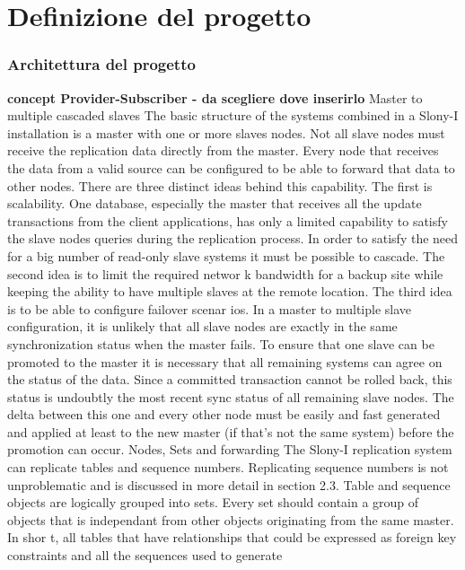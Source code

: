 \chapter{Definizione del progetto}
\setcounter{section}{1}
\item
\subsection{Architettura del progetto}
\textbf{concept Provider-Subscriber - da scegliere dove inserirlo}
Master to multiple cascaded slaves
The basic structure of the systems combined in a Slony-I installation is a
master with one or more slaves nodes. Not all slave nodes must receive the replication
data directly from the master. Every node that receives the data from a
valid source can be configured to be able to forward that data to other nodes.
There are three distinct ideas behind this capability. The first is scalability.
One database, especially the master that receives all the update transactions
from the client applications, has only a limited capability to satisfy the slave
nodes queries during the replication process. In order to satisfy the need for a big
number of read-only slave systems it must be possible to cascade.
The second idea is to limit the required networ k bandwidth for a backup site
while keeping the ability to have multiple slaves at the remote location.
The third idea is to be able to configure failover scenar ios. In a master to
multiple slave configuration, it is unlikely that all slave nodes are exactly in the
same synchronization status when the master fails. To ensure that one slave can
be promoted to the master it is necessary that all remaining systems can agree
on the status of the data. Since a committed transaction cannot be rolled back,
this status is undoubtly the most recent sync status of all remaining slave nodes.
The delta between this one and every other node must be easily and fast generated
and applied at least to the new master (if that’s not the same system) before
the promotion can occur.
Nodes, Sets and forwarding
The Slony-I replication system can replicate tables and sequence numbers.
Replicating sequence numbers is not unproblematic and is discussed in more
detail in section 2.3.
Table and sequence objects are logically grouped into sets. Every set
should contain a group of objects that is independant from other objects originating
from the same master. In shor t, all tables that have relationships that could
be expressed as foreign key constraints and all the sequences used to generate
